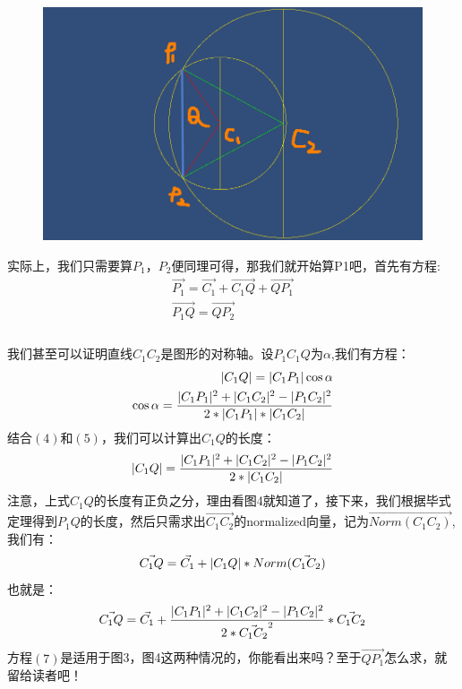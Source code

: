 \documentclass[UTF8,12pt]{article}
\begin{document}
\begin{figure}
	\centering
	\includegraphics[width=0.5\linewidth]{pic3}
	\caption{}
	\label{fig:pic3}
\end{figure}

	实际上，我们只需要算$P_1$，$P_2$便同理可得，那我们就开始算P1吧，首先有方程:
	\begin{eqnarray}
	\vec{P_1} = \vec{C_1}+\vec{C_1Q}+\vec{QP_1}\\
	\vec{P_1Q}=\vec{QP_2}\\
	\end{eqnarray}\\
	我们甚至可以证明直线$C_1C_2$是图形的对称轴。设\angle$P_1C_1Q$为$\alpha$,我们有方程：
	\begin{eqnarray}
	\arrowvert{C_1Q}\arrowvert = \arrowvert{C_1P_1}\arrowvert\cos\alpha\\
	\cos\alpha=\frac{\arrowvert{C_1P_1}\arrowvert^2+\arrowvert{C_1C_2}\arrowvert^2-\arrowvert{P_1C_2}\arrowvert^2}{2*\arrowvert{C_1P_1}\arrowvert*\arrowvert{C_1C_2}\arrowvert} 
	\end{eqnarray}
	结合$(4)$和$(5)$，我们可以计算出$C_1Q$的长度：
	\begin{eqnarray}
		\arrowvert{C_1Q}\arrowvert=\frac{\arrowvert{C_1P_1}\arrowvert^2+\arrowvert{C_1C_2}\arrowvert^2-\arrowvert{P_1C_2}\arrowvert^2}{2*\arrowvert{C_1C_2}\arrowvert} 
	\end{eqnarray}
	注意，上式$C_1Q$的长度有正负之分，理由看图4就知道了，接下来，我们根据毕式定理得到$P_1Q$的长度，然后只需求出$\vec{C_1C_2}$的normalized向量，记为$\vec{Norm(C_1C_2)}$,我们有：
	\begin{eqnarray}
	\vec{C_1Q}=\vec{C_1}+\arrowvert{C_1Q}\arrowvert*Norm(\vec{C_1C_2})
	\end{eqnarray}
	也就是：
	\begin{eqnarray}
	\vec{C_1Q}=\vec{C_1}+\frac{\arrowvert{C_1P_1}\arrowvert^2+\arrowvert{C_1C_2}\arrowvert^2-\arrowvert{P_1C_2}\arrowvert^2}{2*\vec{C_1C_2}^2} *\vec{C_1C_2}
	\end{eqnarray}
	方程$(7)$是适用于图3，图4这两种情况的，你能看出来吗？至于$\vec{QP_1}$怎么求，就留给读者吧！
\end{document}
